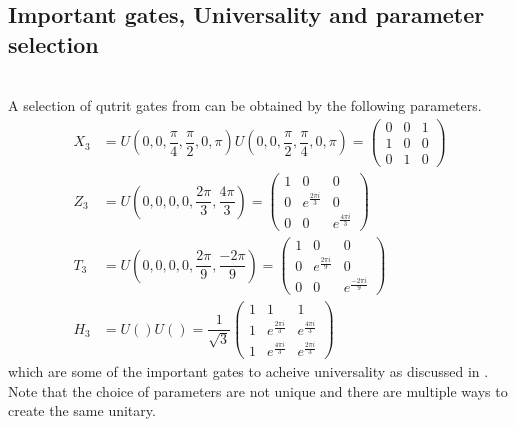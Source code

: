 \subsection{Important gates, Universality and parameter selection}
\\
A selection of qutrit gates from \cite{qudit} can be obtained by the following parameters.\\
\begin{equation}
\begin{aligned}
X_3 &= U(0,0,\dfrac{\pi}{4},\dfrac{\pi}{2},0,\pi)U(0,0,\dfrac{\pi}{2},\dfrac{\pi}{4},0,\pi) 
= \begin{pmatrix}
0&0&1
\\
1&0&0
\\
0&1&0
\end{pmatrix}
\\ 
Z_3 &= U(0,0,0,0,\dfrac{2\pi}{3},\dfrac{4\pi}{3})
= \begin{pmatrix}
1&0&0
\\
0&e^{\frac{2\pi i}{3}}&0
\\
0&0&e^{\frac{4\pi i}{3}}
\end{pmatrix}
\\
T_3 &= U(0,0,0,0,\dfrac{2\pi}{9},\dfrac{-2\pi}{9})
= \begin{pmatrix}
1&0&0
\\
0&e^{\frac{2\pi i}{9}}&0
\\
0&0&e^{\frac{-2\pi i}{9}}
\end{pmatrix}
\\
H_3 &= U()U() 
= \dfrac{1}{\sqrt{3}}\begin{pmatrix}
1&1&1
\\
1&e^{\frac{2\pi i}{3}}&e^{\frac{4\pi i}{3}}
\\
1&e^{\frac{4\pi i}{3}}&e^{\frac{2\pi i}{3}}
\end{pmatrix}
\end{aligned}
\end{equation}
which are some of the important gates to acheive universality\cite{qudit} as discussed in . Note that the choice of parameters are not unique and there are multiple ways to create the same unitary.

